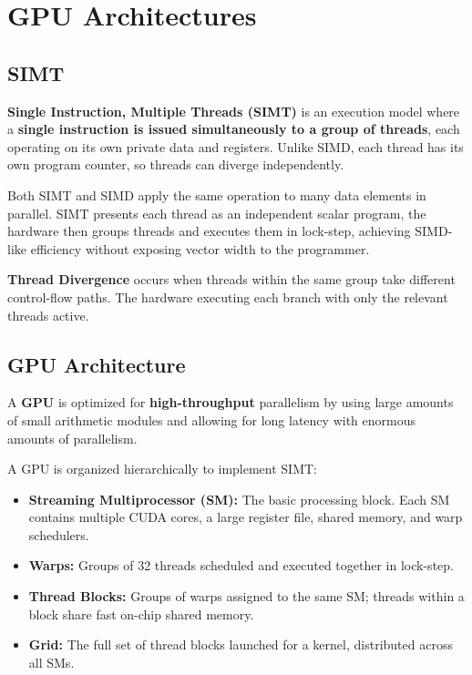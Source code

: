 \section{GPU Architectures}

\subsection{SIMT}

\begin{definition}
    \textbf{Single Instruction, Multiple Threads (SIMT)} is an execution model where a \textbf{single instruction is issued simultaneously to a group of threads}, each operating on its own private data and registers. Unlike SIMD, each thread has its own program counter, so threads can diverge independently.
\end{definition}

\begin{remark}
    Both SIMT and SIMD apply the same operation to many data elements in parallel. SIMT presents each thread as an independent scalar program, the hardware then groups threads and executes them in lock-step, achieving SIMD-like efficiency without exposing vector width to the programmer.
\end{remark}

\begin{definition}
    \textbf{Thread Divergence} occurs when threads within the same group take different control-flow paths. The hardware executing each branch with only the relevant threads active. 
\end{definition}


\subsection{GPU Architecture}

\begin{definition}
    A \textbf{GPU} is optimized for \textbf{high-throughput} parallelism by using large amounts of small arithmetic modules and allowing for long latency with enormous amounts of parallelism.
\end{definition}

\begin{definition}
    A GPU is organized hierarchically to implement SIMT:
    \begin{itemize}
        \item \textbf{Streaming Multiprocessor (SM):} The basic processing block. Each SM contains multiple CUDA cores, a large register file, shared memory, and warp schedulers.
        \item \textbf{Warps:} Groups of 32 threads scheduled and executed together in lock-step.
        \item \textbf{Thread Blocks:} Groups of warps assigned to the same SM; threads within a block share fast on-chip shared memory.
        \item \textbf{Grid:} The full set of thread blocks launched for a kernel, distributed across all SMs.
    \end{itemize}
\end{definition}

